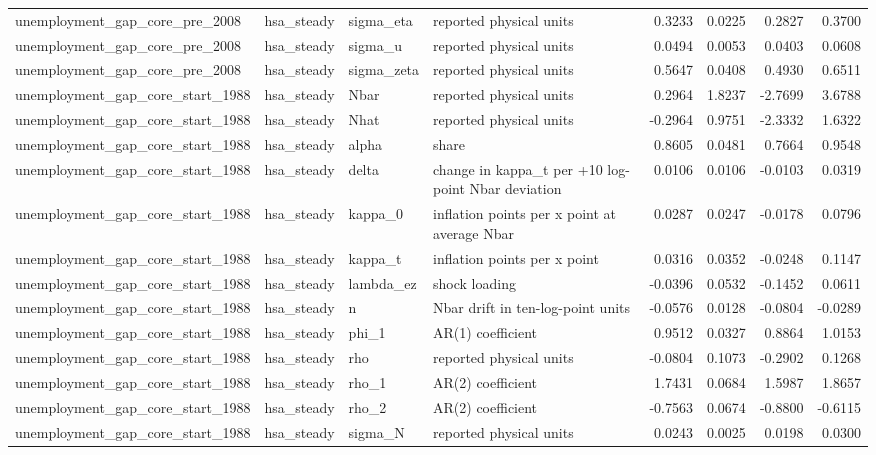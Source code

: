 \begin{tabular}{llllrrrr}
unemployment\_gap\_core\_pre\_2008 & hsa\_steady & sigma\_eta & reported physical units & 0.3233 & 0.0225 & 0.2827 & 0.3700 \\
unemployment\_gap\_core\_pre\_2008 & hsa\_steady & sigma\_u & reported physical units & 0.0494 & 0.0053 & 0.0403 & 0.0608 \\
unemployment\_gap\_core\_pre\_2008 & hsa\_steady & sigma\_zeta & reported physical units & 0.5647 & 0.0408 & 0.4930 & 0.6511 \\
unemployment\_gap\_core\_start\_1988 & hsa\_steady & Nbar & reported physical units & 0.2964 & 1.8237 & -2.7699 & 3.6788 \\
unemployment\_gap\_core\_start\_1988 & hsa\_steady & Nhat & reported physical units & -0.2964 & 0.9751 & -2.3332 & 1.6322 \\
unemployment\_gap\_core\_start\_1988 & hsa\_steady & alpha & share & 0.8605 & 0.0481 & 0.7664 & 0.9548 \\
unemployment\_gap\_core\_start\_1988 & hsa\_steady & delta & change in kappa\_t per +10 log-point Nbar deviation & 0.0106 & 0.0106 & -0.0103 & 0.0319 \\
unemployment\_gap\_core\_start\_1988 & hsa\_steady & kappa\_0 & inflation points per x point at average Nbar & 0.0287 & 0.0247 & -0.0178 & 0.0796 \\
unemployment\_gap\_core\_start\_1988 & hsa\_steady & kappa\_t & inflation points per x point & 0.0316 & 0.0352 & -0.0248 & 0.1147 \\
unemployment\_gap\_core\_start\_1988 & hsa\_steady & lambda\_ez & shock loading & -0.0396 & 0.0532 & -0.1452 & 0.0611 \\
unemployment\_gap\_core\_start\_1988 & hsa\_steady & n & Nbar drift in ten-log-point units & -0.0576 & 0.0128 & -0.0804 & -0.0289 \\
unemployment\_gap\_core\_start\_1988 & hsa\_steady & phi\_1 & AR(1) coefficient & 0.9512 & 0.0327 & 0.8864 & 1.0153 \\
unemployment\_gap\_core\_start\_1988 & hsa\_steady & rho & reported physical units & -0.0804 & 0.1073 & -0.2902 & 0.1268 \\
unemployment\_gap\_core\_start\_1988 & hsa\_steady & rho\_1 & AR(2) coefficient & 1.7431 & 0.0684 & 1.5987 & 1.8657 \\
unemployment\_gap\_core\_start\_1988 & hsa\_steady & rho\_2 & AR(2) coefficient & -0.7563 & 0.0674 & -0.8800 & -0.6115 \\
unemployment\_gap\_core\_start\_1988 & hsa\_steady & sigma\_N & reported physical units & 0.0243 & 0.0025 & 0.0198 & 0.0300 \\

\end{tabular}
